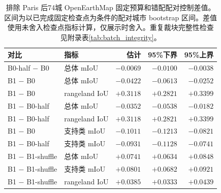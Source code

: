 \begin{table}[H]
\centering
\caption{排除 Paris 后74城 OpenEarthMap 固定预算和错配配对控制差值。区间为以已完成固定检查点为条件的配对城市 bootstrap 区间。差值使用未舍入检查点指标计算，仅展示时舍入。重复裁块完整性检查见附录表\ref{tab:batch_integrity}。}
\label{tab:oem-controls}
\small
\renewcommand{\arraystretch}{1.12}
\setlength{\tabcolsep}{4pt}
\begin{tabular*}{\linewidth}{@{\extracolsep{\fill}}llrrr@{}}
\toprule
对比 & 指标 & 估计 & 95\%下界 & 95\%上界 \\
\midrule
B0-half $-$ B0 & 总体 mIoU & $-0.0069$ & $-0.0100$ & $-0.0038$ \\
B1 $-$ B0 & 总体 mIoU & $-0.0422$ & $-0.0613$ & $-0.0252$ \\
B1 $-$ B0 & rangeland IoU & $+0.3118$ & $+0.2821$ & $+0.3399$ \\
B1 $-$ B0-half & 总体 mIoU & $-0.0352$ & $-0.0538$ & $-0.0182$ \\
B1 $-$ B0-half & rangeland IoU & $+0.3118$ & $+0.2821$ & $+0.3399$ \\
B1 $-$ B0 & 支持类 mIoU & $-0.1011$ & $-0.1213$ & $-0.0821$ \\
B1 $-$ B0-half & 支持类 mIoU & $-0.0931$ & $-0.1128$ & $-0.0741$ \\
B1 $-$ B1-shuffle & 总体 mIoU & $+0.0741$ & $+0.0634$ & $+0.0848$ \\
B1 $-$ B1-shuffle & 支持类 mIoU & $+0.0801$ & $+0.0682$ & $+0.0921$ \\
B1 $-$ B1-shuffle & rangeland IoU & $+0.0385$ & $+0.0333$ & $+0.0439$ \\
\bottomrule
\end{tabular*}
\end{table}
